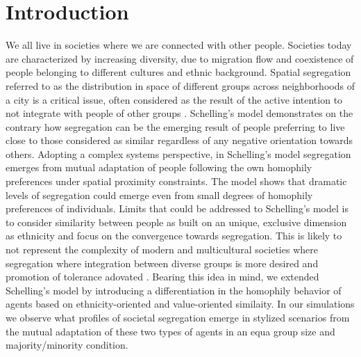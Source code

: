 \documentclass{ws-acs}
\begin{document}

\section{Introduction}
We all live in societies where we are connected with other people. Societies today are characterized by increasing diversity, due to migration flow and coexistence of people belonging to different cultures and ethnic background. Spatial segregation referred to as the distribution in space of different groups across neighborhoods of a city \cite{clark2015} is a critical issue, often considered as the result of the active intention to not integrate with people of other groups \cite{clark2008}. Schelling's model \cite{schelling69} demonstrates on the contrary how segregation can be the emerging result of people preferring to live close to those considered as similar regardless of any negative orientation towards others. Adopting a complex systems perspective, in Schelling's model segregation emerges from mutual adaptation of people following the own homophily preferences under spatial proximity constraints.  The model shows that dramatic levels of segregation could emerge even from small degrees of homophily preferences of individuals. Limits that could be addressed to Schelling's model is to consider similarity between people as built on an unique, exclusive dimension as ethnicity and focus on the convergence towards segregation. This is likely to not represent the complexity of modern and multicultural societies where segregation where integration between diverse groups is more desired and promotion of tolerance adovated \cite{verkuyten2010}. Bearing this idea in mind, we extended Schelling's model by introducing a differentiation in the homophily behavior of agents based on ethnicity-oriented and value-oriented similaity. In our simulations we observe what profiles of societal segregation emerge in stylized scenarios from the mutual adaptation of these two types of agents in an equa group size and majority/minority condition.
\end{document}
